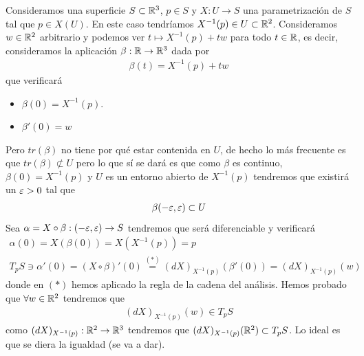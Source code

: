 \begin{observacion}
    Consideramos una superficie $S\subset \mathbb{R}^3$, $p\in S$ y $X:U\to S$ una parametrización de $S$ tal que $p\in X(U)$. En este caso tendríamos $X^{-1}(p)\in U \subset \mathbb{R}^2$. Consideramos $w\in \mathbb{R}^2$ arbitrario y podemos ver $t \mapsto X^{-1}(p)+tw$ para todo $t\in \mathbb{R}$, es decir, consideramos la aplicación $\beta: \mathbb{R} \to \mathbb{R}^3$ dada por 
    \begin{gather*}
        \beta(t) = X^{-1}(p) + tw
    \end{gather*}
    que verificará
    \begin{itemize}
        \item $\beta(0)=X^{-1}(p)$.
        \item $\beta'(0) = w$
    \end{itemize}
    Pero $tr(\beta)$ no tiene por qué estar contenida en $U$, de hecho lo más frecuente es que $tr(\beta)\not\subset U$ pero lo que sí se dará es que como $\beta$ es continuo, $\beta(0)=X^{-1}(p)$ y $U$ es un entorno abierto de $X^{-1}(p)$ tendremos que existirá un $\varepsilon >0$ tal que 
    \begin{gather*}
        \beta (-\varepsilon, \varepsilon) \subset U
    \end{gather*}
    Sea $\alpha = X \circ \beta : (-\varepsilon, \varepsilon) \to S$ tendremos que será diferenciable y verificará 
    \begin{gather*}
        \alpha(0)=X(\beta(0)) = X(X^{-1}(p)) = p\\
        T_pS \owns \alpha'(0) = (X \circ \beta)'(0) \overset{(\ast)}{=} (dX)_{X^{-1}(p)}(\beta'(0)) = (dX)_{X^{-1}(p)}(w)
    \end{gather*}
    donde en $(\ast)$ hemos aplicado la regla de la cadena del análisis. Hemos probado que $\forall w \in \mathbb{R}^2$ tendremos que
    \begin{gather*}
        (dX)_{X^{-1}(p)}(w)\in T_pS
    \end{gather*}
    como $(dX)_{X^{-1}(p)} : \mathbb{R}^2 \to \mathbb{R}^3$ tendremos que $(dX)_{X^{-1}(p)}(\mathbb{R}^2)\subset T_pS$. Lo ideal es que se diera la igualdad (se va a dar). \\
    

\end{observacion}
